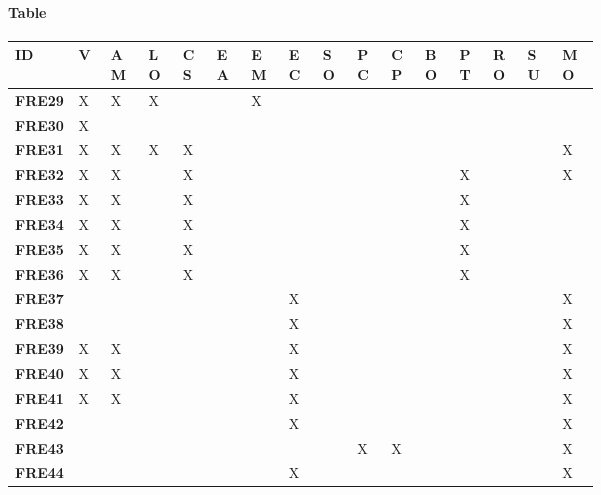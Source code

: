 \paragraph{Table}
\begin{longtable}
{| P{0.085\linewidth} |P{0.03\linewidth} | P{0.044\linewidth} | P{0.04\linewidth} | P{0.04\linewidth} | P{0.04\linewidth} | P{0.04\linewidth} |P{0.04\linewidth} |P{0.04\linewidth} |P{0.04\linewidth} |P{0.04\linewidth} |P{0.04\linewidth} |P{0.04\linewidth} |P{0.04\linewidth} |P{0.04\linewidth} |P{0.04\linewidth} |}
    \hline
    \textbf{ID} & \textbf{V} & \textbf{AM}& \textbf{LO} & \textbf{CS}  & \textbf{EA} & \textbf{EM} & \textbf{EC} & \textbf{SO} & \textbf{PC} & \textbf{CP} & \textbf{BO} & \textbf{PT} & \textbf{RO} & \textbf{SU }&\textbf{MO}\T\B \\
    \hline 
    \hline
    \textbf{FRE29} & X &X &X & & &X & & & & & & & & &\T\B\\
    \hline
    \textbf{FRE30} & X & & & & & & & & & & & & & &\T\B\\
    \hline
    \textbf{FRE31} & X &X &X&X & & & & & & & & & & &X\T\B\\
    \hline
    \textbf{FRE32} & X &X & &X & & & & & & & &X & & &X\T\B\\
    \hline
    \textbf{FRE33} & X &X & &X & & & & & & & &X & & &\T\B\\
    \hline
    \textbf{FRE34} & X &X & &X & & & & & & & &X & & &\T\B\\
    \hline
    \textbf{FRE35} & X &X & &X & & & & & & & &X & & &\T\B\\
    \hline
    \textbf{FRE36} & X &X & &X & & & & & & & &X & & &\T\B\\
    \hline
    \textbf{FRE37} &  & & & & & &X & & & & & & & &X\T\B\\
    \hline
    \textbf{FRE38} &  & & & & & &X & & & & & & & &X\T\B\\
    \hline
    \textbf{FRE39} &X  &X & & & & &X & & & & & & & &X\T\B\\
    \hline
    \textbf{FRE40} &X  &X & & & & &X & & & & & & & &X\T\B\\
    \hline
    \textbf{FRE41} &X  &X & & & & &X & & & & & & & &X\T\B\\
    \hline
    \textbf{FRE42} &  & & & & & &X & & & & & & & &X\T\B\\
    \hline
    \textbf{FRE43} &  & & & & & & & &X &X & & & & &X\T\B\\
    \hline
    \textbf{FRE44} &  & & & & & &X & & & & & & & &X\T\B\\

\end{longtable}
